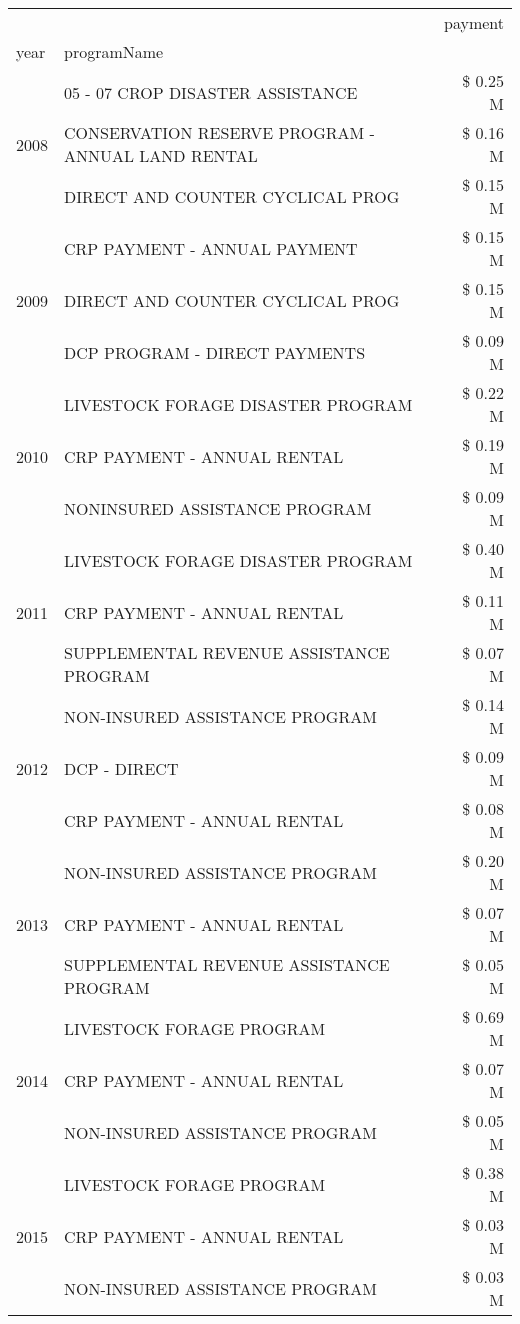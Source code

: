 \begin{tabular}{llr}
\toprule
 &  & payment \\
year & programName &  \\
\midrule
\multirow[t]{3}{*}{2008} & 05 - 07 CROP DISASTER ASSISTANCE & \$ 0.25 M \\
 & CONSERVATION RESERVE PROGRAM - ANNUAL LAND RENTAL & \$ 0.16 M \\
 & DIRECT AND COUNTER CYCLICAL PROG & \$ 0.15 M \\
\cline{1-3}
\multirow[t]{3}{*}{2009} & CRP PAYMENT - ANNUAL PAYMENT & \$ 0.15 M \\
 & DIRECT AND COUNTER CYCLICAL PROG & \$ 0.15 M \\
 & DCP PROGRAM - DIRECT PAYMENTS & \$ 0.09 M \\
\cline{1-3}
\multirow[t]{3}{*}{2010} & LIVESTOCK FORAGE DISASTER PROGRAM & \$ 0.22 M \\
 & CRP PAYMENT - ANNUAL RENTAL & \$ 0.19 M \\
 & NONINSURED ASSISTANCE PROGRAM & \$ 0.09 M \\
\cline{1-3}
\multirow[t]{3}{*}{2011} & LIVESTOCK FORAGE DISASTER PROGRAM & \$ 0.40 M \\
 & CRP PAYMENT - ANNUAL RENTAL & \$ 0.11 M \\
 & SUPPLEMENTAL REVENUE ASSISTANCE PROGRAM & \$ 0.07 M \\
\cline{1-3}
\multirow[t]{3}{*}{2012} & NON-INSURED ASSISTANCE PROGRAM & \$ 0.14 M \\
 & DCP - DIRECT & \$ 0.09 M \\
 & CRP PAYMENT - ANNUAL RENTAL & \$ 0.08 M \\
\cline{1-3}
\multirow[t]{3}{*}{2013} & NON-INSURED ASSISTANCE PROGRAM & \$ 0.20 M \\
 & CRP PAYMENT - ANNUAL RENTAL & \$ 0.07 M \\
 & SUPPLEMENTAL REVENUE ASSISTANCE PROGRAM & \$ 0.05 M \\
\cline{1-3}
\multirow[t]{3}{*}{2014} & LIVESTOCK FORAGE PROGRAM & \$ 0.69 M \\
 & CRP PAYMENT - ANNUAL RENTAL & \$ 0.07 M \\
 & NON-INSURED ASSISTANCE PROGRAM & \$ 0.05 M \\
\cline{1-3}
\multirow[t]{3}{*}{2015} & LIVESTOCK FORAGE PROGRAM & \$ 0.38 M \\
 & CRP PAYMENT - ANNUAL RENTAL & \$ 0.03 M \\
 & NON-INSURED ASSISTANCE PROGRAM & \$ 0.03 M \\

\end{tabular}

